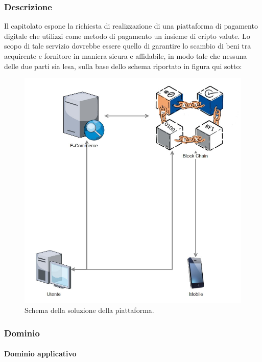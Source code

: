 \documentclass[11pt]{article}
\begin{document}
    \subsubsection{Descrizione}
	Il capitolato espone la richiesta di realizzazione di una piattaforma di pagamento digitale che utilizzi come metodo di pagamento
	un insieme di cripto valute. Lo scopo di tale servizio dovrebbe essere quello di garantire lo scambio di beni tra acquirente e
	fornitore in maniera sicura e affidabile, in modo tale che nessuna delle due parti sia lesa, sulla base dello schema riportato in
	figura qui sotto:
    
    \begin{figure}[h!]
        \centering
        \includegraphics[scale=0.4]{Res/SyncLab.png}
        \caption{Schema della soluzione della piattaforma.}
        \label{SyncLab}
    \end{figure}
    
    \subsubsection{Dominio}
        \paragraph{Dominio applicativo}~\\
        
\end{document}

